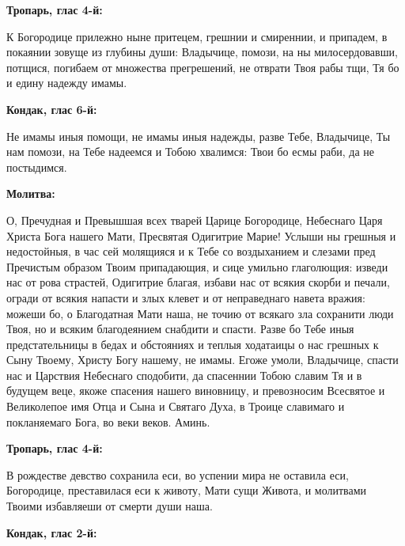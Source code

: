 
\bfseries Тропарь, глас 4-й:\normalfont{}\nopagebreak


К Богородице прилежно ныне притецем, грешнии и смиреннии, и припадем, в покаянии зовуще из глубины души: Владычице, помози, на ны милосердовавши, потщися, погибаем от множества прегрешений, не отврати Твоя рабы тщи, Тя бо и едину надежду имамы.


\medskip


\bfseries Кондак, глас 6-й:\normalfont{}\nopagebreak


Не имамы иныя помощи, не имамы иныя надежды, разве Тебе, Владычице, Ты нам помози, на Тебе надеемся и Тобою хвалимся: Твои бо есмы раби, да не постыдимся.


\medskip


\bfseries Молитва:\normalfont{}\nopagebreak


О, Пречудная и Превышшая всех тварей Царице Богородице, Небеснаго Царя Христа Бога нашего Мати, Пресвятая Одигитрие Марие! Услыши ны грешныя и недостойныя, в час сей молящияся и к Тебе со воздыханием и слезами пред Пречистым образом Твоим припадающия, и сице умильно глаголющия: изведи нас от рова страстей, Одигитрие благая, избави нас от всякия скорби и печали, огради от всякия напасти и злых клевет и от неправеднаго навета вражия: можеши бо, о Благодатная Мати наша, не точию от всякаго зла сохранити люди Твоя, но и всяким благодеянием снабдити и спасти. Разве бо Тебе иныя предстательницы в бедах и обстояниях и теплыя ходатаицы о нас грешных к Сыну Твоему, Христу Богу нашему, не имамы. Егоже умоли, Владычице, спасти нас и Царствия Небеснаго сподобити, да спасеннии Тобою славим Тя и в будущем веце, якоже спасения нашего виновницу, и превозносим Всесвятое и Великолепое имя Отца и Сына и Святаго Духа, в Троице славимаго и покланяемаго Бога, во веки веков. Аминь.
\nopagebreak\bigskip\bigskip\mychapterending

 


\bfseries Тропарь, глас 4-й:\normalfont{}\nopagebreak


В рождестве девство сохранила еси, во успении мира не оставила еси, Богородице, преставилася еси к животу, Мати сущи Живота, и молитвами Твоими избавляеши от смерти души наша.


\medskip


\bfseries Кондак, глас 2-й:\normalfont{}\nopagebreak


